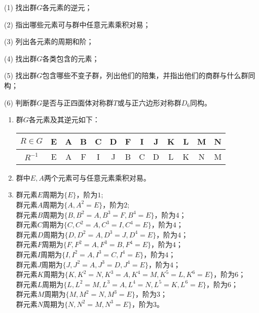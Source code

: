 \documentclass[reqno,a4paper,12pt]{amsart}
\begin{document}
\begin{enumerate}[1.]
(1) 找出群$G$各元素的逆元；

(2) 指出哪些元素可与群中任意元素乘积对易；

(3) 列出各元素的周期和阶；

(4) 找出群$G$各类包含的元素；

(5) 找出群$G$包含哪些不变子群，列出他们的陪集，并指出他们的商群与什么群同构；

(6) 判断群$G$是否与正四面体对称群$T$或与正六边形对称群$D_6$同构。
\begin{tcolorbox}[breakable, colback = black!5!white, colframe = black]
\begin{enumerate}[(1)]

\item 群$G$各元素及其逆元如下：
\begin{table}[H]
\centering
\begin{tabular}{|c|c|c|c|c|c|c|c|c|c|c|c|c|}
	\hline 
	$R\in G$ & E & A & B & C & D & F & I & J & K & L & M & N \\
	\hline
	$R^{-1}$ & E & A & F & I & J & B & C & D & L & K & N & M \\
	\hline
\end{tabular}
\end{table}

\item 群中$E, A$两个元素可与任意元素乘积对易。

\item 群元素$E$周期为$\{E\}$，阶为$1$; \\
群元素$A$周期为$\{A, A^2=E\}$，阶为$2$; \\
群元素$B$周期为$\{B, B^2=A, B^3=F, B^4=E\}$，阶为$4$；\\
群元素$C$周期为$\{C, C^2=A, C^3=I, C^4=E\}$，阶为$4$；\\
群元素$D$周期为$\{D, D^2=A, D^3=J, D^4=E\}$，阶为$4$；\\
群元素$F$周期为$\{F, F^2=A, F^3=B, F^4=E\}$，阶为$4$；\\
群元素$I$周期为$\{I, I^2=A, I^3=C, I^4=E\}$，阶为$4$；\\
群元素$J$周期为$\{J, J^2=A, J^3=D, J^4=E\}$，阶为$4$；\\
群元素$K$周期为$\{K, K^2=N, K^3=A, K^4=M, K^5=L, K^6=E\}$，阶为$6$；\\
群元素$L$周期为$\{L, L^2=M, L^3=A, L^4=N, L^5=K, L^6=E\}$，阶为$6$；\\
群元素$M$周期为$\{M, M^2=N, M^3=E\}$，阶为$3$；\\
群元素$N$周期为$\{N, N^2=M, N^3=E\}$，阶为$3$。


\end{enumerate}
\end{tcolorbox}
\end{enumerate}
\end{document}
